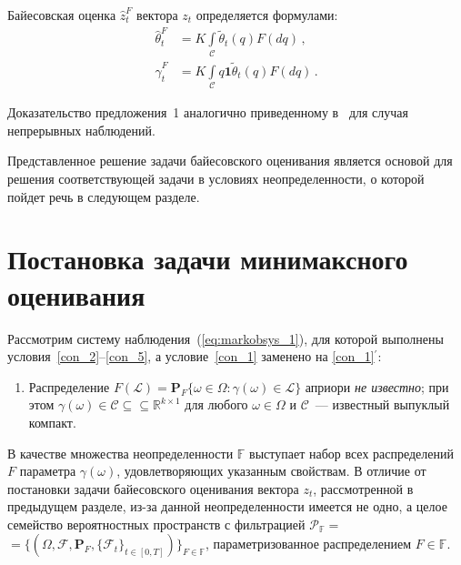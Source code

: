 \begin{multicols}{2}
Байесовская оценка $\widehat{z}^F_t$ вектора $z_t$
 определяется формулами:
 \begin{align*}
 \widehat{\theta}^F_t &=K \displaystyle \int\limits_{\mathcal{C}}
 \widetilde{\theta}_t(q)F(dq)\,,\\ %
 \widehat{\gamma}^F_t & =K \int\limits_{\mathcal{C}}
 q\mathbf{1}\widetilde{\theta}_t(q)F(dq)\,. %
 \end{align*}

Доказательство предложения~1 аналогично приведенному
в~\cite{bor_2007} для случая непрерывных наблюдений.

Представленное решение задачи байесовского оценивания является
основой для решения соответствующей задачи в условиях
неопределенности, о которой пойдет речь в следующем разделе.

 \section{Постановка задачи минимаксного оценивания} %

 Рассмотрим систему наблюдения~(\ref{eq:markobsys_1}), для которой
 выполнены условия~\ref{con_2}--\ref{con_5}, а условие~\ref{con_1}
заменено на \ref{con_1}$^\prime$:
 \begin{enumerate}[I$^\prime$]
 \item \label{con_1p}
Распределение $F(\mathcal{L}) = \mathbf{P}_F\{\omega \in \Omega
\!:\! \gamma(\omega) \in \mathcal{L}\}$ априори \emph{не известно};
при этом $\gamma(\omega) \in \mathcal{C} \subseteq $\linebreak $\subseteq\mathbb{R}^{k
\times 1}$ для любого $\omega \in \Omega$ и $\mathcal{C}$~---
известный выпуклый компакт.
 \end{enumerate}

 В качестве множества неопределенности $\mathbb{F}$ выступает набор всех распределений $F$
 па\-ра\-мет\-ра $\gamma(\omega)$, удовлетворяющих указанным свойствам.
 В отличие от постановки задачи байесовского
оценивания вектора $z_t$, рассмотренной в предыдущем разделе, из-за
данной неопределен\-ности имеется не одно, а целое семейство
вероятност\-ных пространств с фильтрацией
$\mathcal{P}_{\mathbb{F}}= $\linebreak $=\{(\Omega,\mathcal{F},
\mathbf{P}_F,\{\mathcal{F}_t\}_{t \in [0,T]})\}_{F \in \mathbb{F}}$,
параметризованное распределением $F \in \mathbb{F}$.


\end{multicols}
